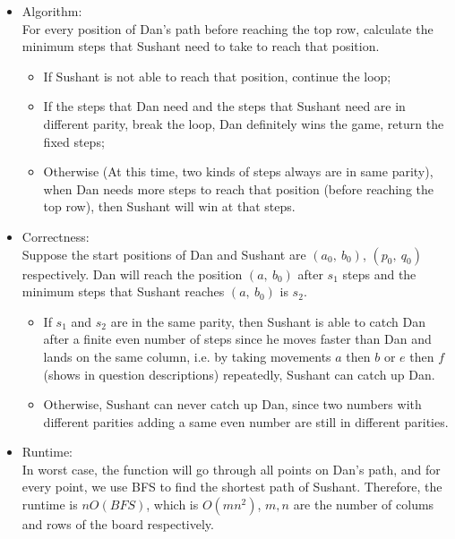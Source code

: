 \documentclass{assignment-263}
\begin{document}
\begin{itemize}
    \item{Algorithm:}
    \\For every position of Dan's path before reaching the top row, calculate the minimum steps that Sushant need to take to reach that position. 
    \begin{itemize}
        \item If Sushant is not able to reach that position, continue the loop;
        \item If the steps that Dan need and the steps that Sushant need are in different parity, break the loop, Dan definitely wins the game, return the fixed steps;
        \item Otherwise (At this time, two kinds of steps always are in same parity), when Dan needs more steps to reach that position (before reaching the top row), then Sushant will win at that steps.
    \end{itemize}
    \item{Correctness:}
    \\Suppose the start positions of Dan and Sushant are $(a_0,\ b_0)$, $(p_0,\ q_0)$ respectively. Dan will reach the position $(a,\ b_0)$ after $s_1$ steps and the minimum steps that Sushant reaches $(a,\ b_0)$ is $s_2$.
    \begin{itemize}
        \item If $s_1$ and $s_2$ are in the same parity, then Sushant is able to catch Dan after a finite even number of steps since he moves faster than Dan and lands on the same column, i.e. by taking movements $a$ then $b$ or $e$ then $f$ (shows in question descriptions) repeatedly, Sushant can catch up Dan.
        \item Otherwise, Sushant can never catch up Dan, since two numbers with different parities adding a same even number are still in different parities.
    \end{itemize}
    \item{Runtime:}
    \\In worst case, the function will go through all points on Dan's path, and for every point, we use BFS to find the shortest path of Sushant. Therefore, the runtime is $nO(BFS)$, which is $O(mn^2)$, $m, n$ are the number of colums and rows of the board respectively.
\end{itemize}


\newpage
\program
\end{document}
